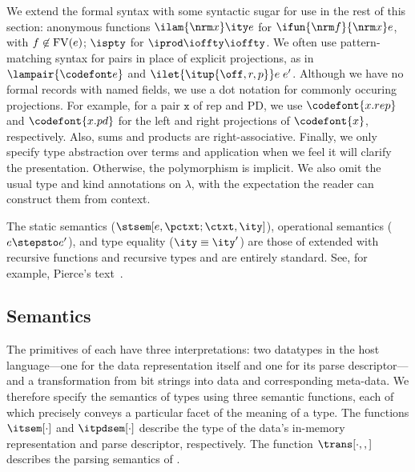 {We extend the formal syntax with some syntactic sugar for use in the
rest of this section: anonymous functions $\ilam {\nrm x} \ity e$ for
$\ifun {\nrm f} {\nrm x} e$, with $f \not\in {\rm FV}(e)$; $\ispty$
for $\iprod \ioffty \ioffty$.  We often use pattern-matching syntax
for pairs in place of explicit projections, as in $\lampair{\codefont
  e}$ and $\ilet {\itup{\off,r,p}} e\; e'$.  Although we have no
formal records with named fields, we use a dot notation for commonly
occuring projections. For example, for a pair $\mathtt x$ of rep and
PD, we use $\codefont{x.rep}$ and $\codefont{x.pd}$ for the left and
right projections of $\codefont{x}$, respectively. Also, sums and
products are right-associative.  Finally, we only specify type
abstraction over terms and application when we feel it will clarify
the presentation. Otherwise, the polymorphism is implicit.  We also
omit the usual type and kind annotations on $\lambda$, with the
expectation the reader can construct them from context.  

The static semantics ($\stsem[e,{\pctxt;\ctxt},\ity]$), operational
semantics ($e \stepsto e'$), and type 
equality ($\ity \equiv \ity'$) are those of \fomega{} extended with
recursive functions and recursive types and are entirely standard.
See, for example, Pierce's text~\cite{pierce:tapl}.

\subsection{\ddc{} Semantics}
\label{sec:ddc-sem}

The primitives of \ddc{} each have three interpretations: two
datatypes in the host language---one for the data representation
itself and one for its parse descriptor---and a transformation from
bit strings into data and corresponding
meta-data.  We therefore specify the semantics of \ddc{} types using three semantic
functions, each of which precisely conveys a particular facet of the
meaning of a type.  The functions $\itsem[\cdot]$ and $\itpdsem[\cdot]$
describe the type of the data's in-memory representation and 
parse descriptor, respectively. The
function $\trans[\cdot,,]$ describes the parsing semantics of
\ddc{}.

}
